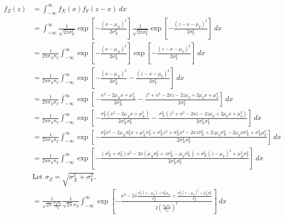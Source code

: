 \documentclass[twoside]{article}
\numberwithin{equation}{section}
\numberwithin{figure}{section}
\begin{document}
{
  \allowdisplaybreaks
\begin{align*}
  f_Z(z) &= \int_{-\infty}^{\infty} f_X(x) f_Y(z - x) \: dx \\
  &= \int_{-\infty}^{\infty} \frac{1}{\sqrt{2 \pi \sigma_X^2}} \exp \left[{-\frac{(x - \mu_X)^2}{2 \sigma_X^2}} \right] \frac{1}{\sqrt{2 \pi \sigma_Y^2}} \exp \left[{-\frac{(z - x - \mu_Y)^2}{2 \sigma_Y^2}} \right] \: dx \\[10pt]
  &= \frac{1}{2 \pi \sigma_X \sigma_Y} \int_{-\infty}^{\infty} \exp \left[{-\frac{(x - \mu_X)^2}{2 \sigma_X^2}} \right] \exp \left[{-\frac{(z - x - \mu_Y)^2}{2 \sigma_Y^2}} \right] \: dx \\[10pt]
  &= \frac{1}{2 \pi \sigma_X \sigma_Y} \int_{-\infty}^{\infty} \exp\left[{-\frac{(x - \mu_X)^2}{2 \sigma_X^2} - \frac{(z - x - \mu_Y)^2}{2 \sigma_Y^2}} \right] \: dx \\[10pt]
  &= \frac{1}{2 \pi \sigma_X \sigma_Y} \int_{-\infty}^{\infty} \exp\left[{-\frac{x^2 - 2 \mu_X x + \mu_X^2}{2 \sigma_X^2} - \frac{z^2 + x^2 - 2 x z - 2 z \mu_Y + 2 \mu_Y x + \mu_Y^2}{2 \sigma_Y^2}} \right] \: dx \\[10pt]
  &= \frac{1}{2 \pi \sigma_X \sigma_Y} \int_{-\infty}^{\infty} \exp\left[{-\frac{\sigma_Y^2(x^2 - 2 \mu_X x + \mu_X^2)}{2 \sigma_X^2 \sigma_Y^2} - \frac{\sigma_X^2(z^2 + x^2 - 2 x z - 2 z \mu_Y + 2 \mu_Y x + \mu_Y^2)}{2 \sigma_X^2 \sigma_Y^2 }} \right] \: dx \\[10pt]
  &= \frac{1}{2 \pi \sigma_X \sigma_Y} \int_{-\infty}^{\infty} \exp\left[{-\frac{\sigma_Y^2 x^2 - 2 \mu_X \sigma_Y^2 x + \mu_X^2 \sigma_Y^2 + \sigma_X^2 z^2 + \sigma_X^2 x^2 - 2xz\sigma_X^2 + 2 z \mu_Y \sigma_X^2 - 2\mu_Y x \sigma_X^2 + \sigma_X^2 \mu_Y^2}{2 \sigma_X^2 \sigma_Y^2}} \right] \: dx \\[10pt]
  &= \frac{1}{2 \pi \sigma_X \sigma_Y} \int_{-\infty}^{\infty} \exp\left[{-\frac{\left(\sigma_X^2 + \sigma_Y^2\right) x^2 - 2 x \left( \mu_X \sigma_Y^2 + z \sigma_X^2 - \mu_Y \sigma_X^2 \right) + \sigma_X^2 \left( z - \mu_Y \right)^2 + \mu_X^2 \sigma_Y^2}{2 \sigma_X^2 \sigma_Y^2}} \right] \: dx \\[10pt]
  &\text{Let $\sigma_Z = \sqrt{\sigma_X^2 + \sigma_Y^2}$}. \\
  &= \frac{1}{\sqrt{2 \pi} \frac{\sigma_X \sigma_Y}{\sigma_Z}} \frac{1}{\sqrt{2 \pi} \sigma_Z} \int_{-\infty}^{\infty} \exp\left[{-\frac{x^2 - 2x \frac{\sigma_X^2 (z - \mu_Y) + \sigma_Y^2 \mu_X}{\sigma_Z^2} + \frac{\sigma_X^2 \left( z - \mu_Y \right)^2 + \mu_X^2 \sigma_Y^2}{\sigma_Z^2}}{2 \left(\frac{\sigma_X \sigma_Y}{\sigma_Z}\right)^2}} \right] \: dx \\[10pt]

\end{align*}}
\end{document}
